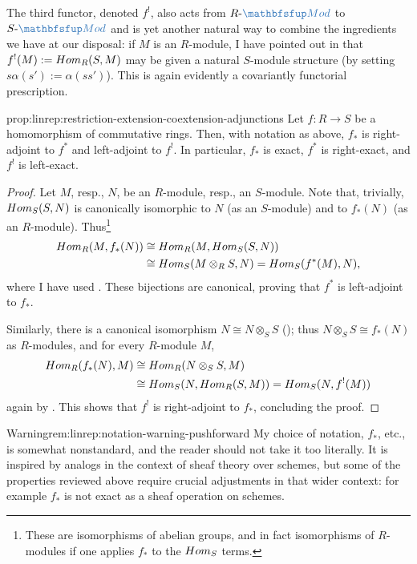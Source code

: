 The third functor, denoted $f^!$, also acts from
$R\text{-}\categ{Mod}$ to $S\text{-}\categ{Mod}$ and is yet another
natural way to combine the ingredients we have at our disposal: if $M$
is an $R$-module, I have pointed out in
 that
$f^!(M) := Hom_R(S, M)$ may be given a natural $S$-module structure
(by setting $s\alpha(s') := \alpha(ss')$). This is again evidently a
covariantly functorial prescription.
\begin{prop}{}{prop:linrep:restriction-extension-coextension-adjunctions}
  Let $f : R \to S$ be a homomorphism of commutative rings. Then, with
  notation as above, $f_*$ is right-adjoint to $f^*$ and left-adjoint
  to $f^!$. In particular, $f_*$ is exact, $f^*$ is right-exact, and
  $f^!$ is left-exact.
\end{prop}
\begin{proof}
  Let $M$, resp., $N$, be an $R$-module, resp., an $S$-module. Note
  that, trivially, $Hom_S(S, N)$ is canonically isomorphic to $N$ (as
  an $S$-module) and to $f_*(N)$ (as an
  $R$-module). Thus\footnote{These are isomorphisms of abelian groups,
    and in fact isomorphisms of $R$-modules if one applies $f_*$ to
    the $Hom_S$ terms.}
  \begin{align*}
    Hom_R(M, f_*(N))
    &\cong Hom_R(M, Hom_S(S, N)) \\
    &\cong Hom_S(M \otimes_R S, N) = Hom_S(f^*(M), N),
  \end{align*}
  where I have used
  .
  These bijections are canonical, proving that $f^*$
  is left-adjoint to $f_*$.

  Similarly, there is a canonical isomorphism $N \cong N \otimes_S S$
  ();
  thus $N \otimes_S S \cong f_*(N)$ as
  $R$-modules, and for every $R$-module $M$,
  \begin{align*}
    Hom_R(f_*(N), M)
    &\cong Hom_R(N \otimes_S S, M) \\
    &\cong Hom_S(N, Hom_R(S, M))
      = Hom_S(N, f^!(M))
  \end{align*}
  again by .
  This shows that $f^!$ is right-adjoint
  to $f_*$, concluding the proof.
\end{proof}

\begin{rem}{Warning}{rem:linrep:notation-warning-pushforward}
  My choice of notation, $f_*$, etc., is somewhat nonstandard, and the
  reader should not take it too literally. It is inspired by analogs
  in the context of sheaf theory over schemes, but some of the
  properties reviewed above require crucial adjustments in that wider
  context: for example $f_*$ is not exact as a sheaf operation on
  schemes.
\end{rem}

